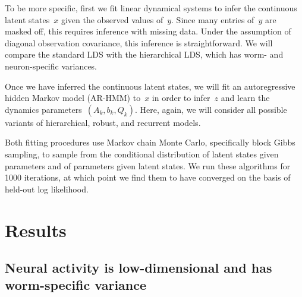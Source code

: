 \documentclass{article}
\begin{document}

To be more specific, first we fit linear dynamical systems to infer
the continuous latent states~$x$ given the observed values of~$y$.
Since many entries of~$y$ are masked off, this requires inference
with missing data.  Under the assumption of diagonal observation
covariance, this inference is straightforward.  We will compare the
standard LDS with the hierarchical LDS, which has worm- and neuron-specific
variances.

Once we have inferred the continuous latent states, we will fit
an autoregressive hidden Markov model (AR-HMM) to~$x$ in order
to infer~$z$ and learn the dynamics parameters~$(A_k, b_k, Q_k)$.
Here, again, we will consider all possible variants of hierarchical,
robust, and recurrent models.

Both fitting procedures use Markov chain Monte Carlo, specifically
block Gibbs sampling, to sample from the conditional distribution
of latent states given parameters and of parameters given latent
states.  We run these algorithms for 1000 iterations, at which
point we find them to have converged on the basis of held-out
log likelihood. 



\section{Results}
\label{sec:results}

\clearpage

\subsection{Neural activity is low-dimensional and has worm-specific variance}
\end{document}
